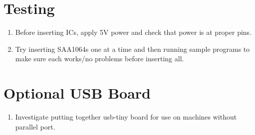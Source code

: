 \documentclass[11pt]{article}
\begin{document}
\section{Testing}
\begin{enumerate}
\item Before inserting ICs, apply 5V power and check that power is
      at proper pins.
\item Try inserting SAA1064s one at a time and then running sample
      programs to make sure each works/no problems before inserting all.
\end{enumerate}


\section{Optional USB Board}
\begin{enumerate}
\item Investigate putting together usb-tiny board for use on machines
      without parallel port.
\end{enumerate}
\end{document}
